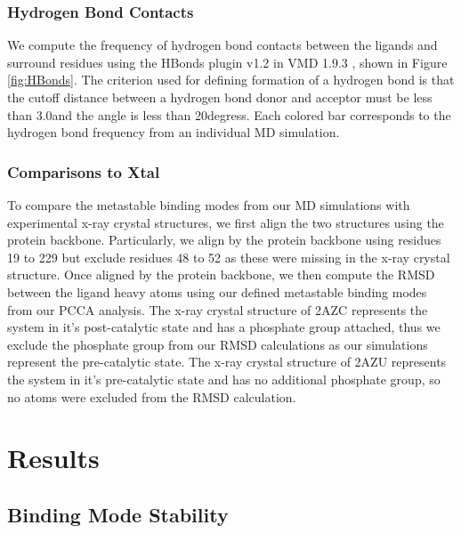 \documentclass[fleqn,10pt]{wlscirep}
\newcommand{\angstrom}{\text{\normalfont\AA}}
\begin{document}
\subsubsection{Hydrogen Bond Contacts}

We compute the frequency of hydrogen bond contacts between the ligands and surround residues using the HBonds plugin v1.2 \cite{} in VMD 1.9.3 \cite{}, shown in Figure \ref{fig:HBonds}.
The criterion used for defining formation of a hydrogen bond is that the cutoff distance between a hydrogen bond donor and acceptor must be less than 3.0\angstrom and the angle is less than 20degress.
Each colored bar corresponds to the hydrogen bond frequency from an individual MD simulation.


\subsubsection{Comparisons to Xtal}
To compare the metastable binding modes from our MD simulations with experimental x-ray crystal structures, we first align the two structures using the protein backbone.
Particularly, we align by the protein backbone using residues 19 to 229 but exclude residues 48 to 52 as these were missing in the x-ray crystal structure.
Once aligned by the protein backbone, we then compute the RMSD between the ligand heavy atoms using our defined metastable binding modes from our PCCA analysis.
The x-ray crystal structure of 2AZC represents the system in it's post-catalytic state and has a phosphate group attached, thus we exclude the phosphate group from our RMSD calculations as our simulations represent the pre-catalytic state.
The x-ray crystal structure of 2AZU represents the system in it's pre-catalytic state and has no additional phosphate group, so no atoms were excluded from the RMSD calculation.


\section{Results}

\subsection{Binding Mode Stability}
\end{document}
